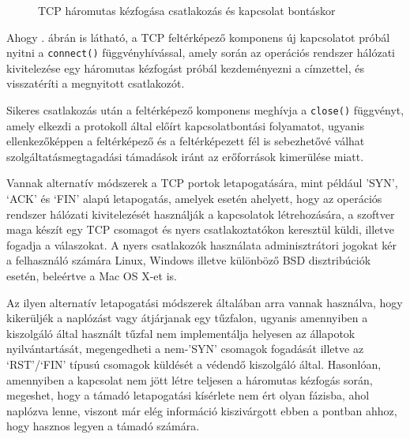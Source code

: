 	\begin{figure}[!htbp]
		\centering
		\caption{TCP háromutas kézfogása csatlakozás és kapcsolat bontáskor}
		\label{tcp3way}
	\end{figure}
	
	Ahogy \az{\ref{tcp3way}}. ábrán is látható, a TCP feltérképező komponens új kapcsolatot próbál nyitni a \texttt{connect()} függvényhívással, amely során az operációs rendszer hálózati kivitelezése egy háromutas kézfogást próbál kezdeményezni a címzettel, és visszatéríti a megnyitott csatlakozót.
	
	Sikeres csatlakozás után a feltérképező komponens meghívja a \texttt{close()} függvényt, amely elkezdi a protokoll által előírt kapcsolatbontási folyamatot, ugyanis ellenkezőképpen a feltérképező és a feltérképezett fél is sebezhetővé válhat szolgáltatásmegtagadási támadások iránt az erőforrások kimerülése miatt\cite{erickson08}.
	
	Vannak alternatív módszerek a TCP portok letapogatására, mint például 'SYN', `ACK' és `FIN' alapú letapogatás\cite{kris07}, amelyek esetén ahelyett, hogy az operációs rendszer hálózati kivitelezését használják a kapcsolatok létrehozására, a szoftver maga készít egy TCP csomagot és nyers csatlakoztatókon keresztül küldi, illetve fogadja a válaszokat. A nyers csatlakozók használata adminisztrátori jogokat kér a felhasználó számára Linux, Windows illetve különböző BSD disztribúciók esetén, beleértve a Mac OS X-et is.
	
	Az ilyen alternatív letapogatási módszerek általában arra vannak használva, hogy kikerüljék a naplózást vagy átjárjanak egy tűzfalon, ugyanis amennyiben a kiszolgáló által használt tűzfal nem implementálja helyesen az állapotok nyilvántartását, megengedheti a nem-'SYN' csomagok fogadását illetve az `RST'/`FIN' típusú csomagok küldését a védendő kiszolgáló által. Hasonlóan, amennyiben a kapcsolat nem jött létre teljesen a háromutas kézfogás során, megeshet, hogy a támadó letapogatási kísérlete nem ért olyan fázisba, ahol naplózva lenne, viszont már elég információ kiszivárgott ebben a pontban ahhoz, hogy hasznos legyen a támadó számára.
	
